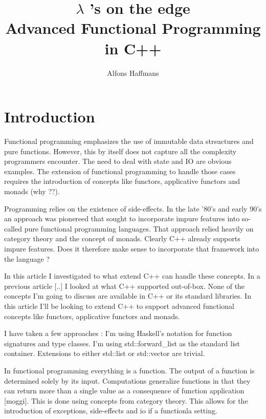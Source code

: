 \documentclass[12pt,fleqn]{article}
\begin{document}
\title{$\lambda$ 's on the edge \\ Advanced Functional Programming in C++}
\author {Alfons Haffmans}
\maketitle
\section* {Introduction}

  
Functional programming emphasizes the use of immutable data strsuctures and pure functions.
However, this by itself does not capture all the complexity programmers encounter.
The need to deal with state and IO are obvious examples.
The extension of functional programming to handle those cases requires the introduction of concepts like functors, applicative functors and monads (why ??).


Programming relies on the existence of side-effects.
In the late '80's and early 90's an approach was pionereed that sought to incorporate impure features into so-called pure functional programming languages.
That approach relied heavily on category theory and the concept of monads.
Clearly C++ already supports impure features.
Does it therefore make sense to incorporate that framework into the language ?


In this article I investigated to what extend C++ can handle these concepts.
In a previous article [..] I looked at what C++ supported out-of-box.
None of the concepts I'm going to discuss are available in C++ or its standard libraries.
In this article I'll be looking to extend C++ to support advanced functional concepts like functors, applicative functors and monads.

I have taken a few approaches :
I'm using Haskell's notation for function signatures and type classes.
I'm using std::forward\_list as the standard list container. Extensions to either std::list or std::vector are trivial.

In functional programming everything is a function.
The output of a function is determined solely by its input.
Computations generalize functions in that they can return more than a single value as a consequence of function application [moggi].
This is done using concepts from category theory.
This allows for the introduction of exceptions, side-effects and io if a functionla setting.
\end{document}
